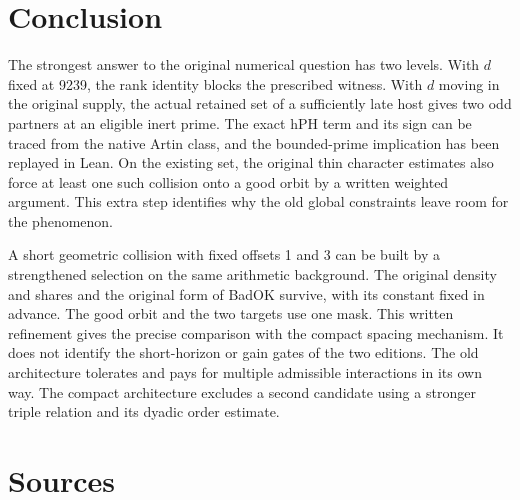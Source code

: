 \documentclass[12pt,letterpaper]{article}
\DeclareRobustCommand{\id}[1]{\mbox{\small\ttfamily #1}}
\begin{document}
\section{Conclusion}

The strongest answer to the original numerical question has two levels. With \(d\) fixed at 9239, the rank identity blocks the prescribed witness. With \(d\) moving in the original supply, the actual retained set of a sufficiently late host gives two odd partners at an eligible inert prime. The exact \id{hPH} term and its sign can be traced from the native Artin class, and the bounded-prime implication has been replayed in Lean. On the existing set, the original thin character estimates also force at least one such collision onto a good orbit by a written weighted argument. This extra step identifies why the old global constraints leave room for the phenomenon.

A short geometric collision with fixed offsets 1 and 3 can be built by a strengthened selection on the same arithmetic background. The original density and shares and the original form of \id{BadOK} survive, with its constant fixed in advance. The good orbit and the two targets use one mask. This written refinement gives the precise comparison with the compact spacing mechanism. It does not identify the short-horizon or gain gates of the two editions. The old architecture tolerates and pays for multiple admissible interactions in its own way. The compact architecture excludes a second candidate using a stronger triple relation and its dyadic order estimate.

\section{Sources}
\end{document}
